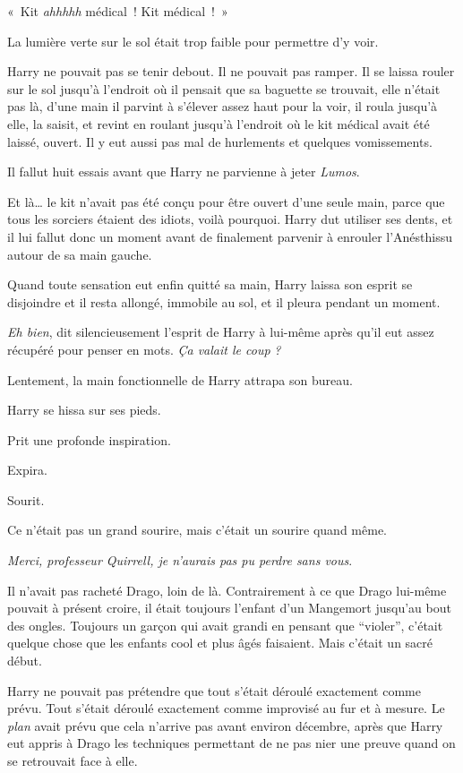 «~Kit \emph{ahhhhh} médical~! Kit médical~!~»

La lumière verte sur le sol était trop faible pour permettre d'y voir.

Harry ne pouvait pas se tenir debout. Il ne pouvait pas ramper. Il se laissa rouler sur le sol jusqu'à l'endroit où il pensait que sa baguette se trouvait, elle n'était pas là, d'une main il parvint à s'élever assez haut pour la voir, il roula jusqu'à elle, la saisit, et revint en roulant jusqu'à l'endroit où le kit médical avait été laissé, ouvert. Il y eut aussi pas mal de hurlements et quelques vomissements.

Il fallut huit essais avant que Harry ne parvienne à jeter \emph{Lumos}.

Et là… le kit n'avait pas été conçu pour être ouvert d'une seule main, parce que tous les sorciers étaient des idiots, voilà pourquoi. Harry dut utiliser ses dents, et il lui fallut donc un moment avant de finalement parvenir à enrouler l'Anésthissu autour de sa main gauche.

Quand toute sensation eut enfin quitté sa main, Harry laissa son esprit se disjoindre et il resta allongé, immobile au sol, et il pleura pendant un moment.

\emph{Eh bien}, dit silencieusement l'esprit de Harry à lui-même après qu'il eut assez récupéré pour penser en mots. \emph{Ça valait le coup} \emph{?}

Lentement, la main fonctionnelle de Harry attrapa son bureau.

Harry se hissa sur ses pieds.

Prit une profonde inspiration.

Expira.

Sourit.

Ce n'était pas un grand sourire, mais c'était un sourire quand même.

\emph{Merci, professeur Quirrell, je n'aurais pas pu perdre sans vous}.

Il n'avait pas racheté Drago, loin de là. Contrairement à ce que Drago lui-même pouvait à présent croire, il était toujours l'enfant d'un Mangemort jusqu'au bout des ongles. Toujours un garçon qui avait grandi en pensant que “violer”, c'était quelque chose que les enfants cool et plus âgés faisaient. Mais c'était un sacré début.

Harry ne pouvait pas prétendre que tout s'était déroulé exactement comme prévu. Tout s'était déroulé exactement comme improvisé au fur et à mesure. Le \emph{plan} avait prévu que cela n'arrive pas avant environ décembre, après que Harry eut appris à Drago les techniques permettant de ne pas nier une preuve quand on se retrouvait face à elle.


